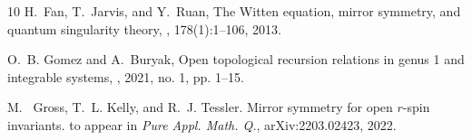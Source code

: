 \documentclass[11pt]{amsart}
\theoremstyle{definition}
\theoremstyle{remark}
\newcommand{\<}{\left<}
\renewcommand{\>}{\right>}
\numberwithin{equation}{section}
\begin{document}
\begin{thebibliography}{10}
H.~Fan, T.~Jarvis, and %
Y.~Ruan,
\newblock The {W}itten equation, mirror symmetry, and quantum singularity
  theory,
, 178(1):1--106, 2013.

O.~B. Gomez and A.~Buryak,
\newblock Open topological recursion relations in genus 1 and integrable
  systems,
, 2021, no. 1, pp. 1--15.

M.%
~Gross, T.~L. Kelly, and R.~J. Tessler.
\newblock Mirror symmetry for open $r$-spin invariants.
\newblock to appear in \textit{Pure Appl. Math. Q.}, arXiv:2203.02423, 2022.


\end{thebibliography}
\end{document}
